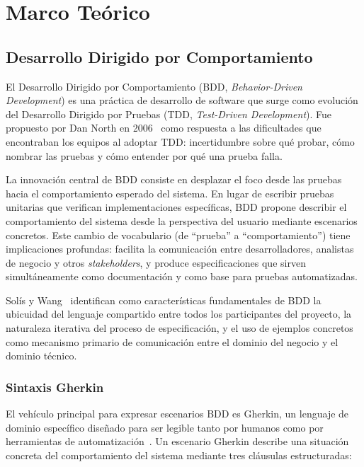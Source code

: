 \chapter{Marco Teórico}

\section{Desarrollo Dirigido por Comportamiento}
\label{sec:bdd}

El Desarrollo Dirigido por Comportamiento (BDD, \textit{Behavior-Driven Development}) es una práctica de desarrollo de software que surge como evolución del Desarrollo Dirigido por Pruebas (TDD, \textit{Test-Driven Development}). Fue propuesto por Dan North en 2006~\cite{north2006bdd} como respuesta a las dificultades que encontraban los equipos al adoptar TDD: incertidumbre sobre qué probar, cómo nombrar las pruebas y cómo entender por qué una prueba falla.

La innovación central de BDD consiste en desplazar el foco desde las pruebas hacia el comportamiento esperado del sistema. En lugar de escribir pruebas unitarias que verifican implementaciones específicas, BDD propone describir el comportamiento del sistema desde la perspectiva del usuario mediante escenarios concretos. Este cambio de vocabulario (de ``prueba'' a ``comportamiento'') tiene implicaciones profundas: facilita la comunicación entre desarrolladores, analistas de negocio y otros \textit{stakeholders}, y produce especificaciones que sirven simultáneamente como documentación y como base para pruebas automatizadas.

Solís y Wang~\cite{solis2011bdd} identifican como características fundamentales de BDD la ubicuidad del lenguaje compartido entre todos los participantes del proyecto, la naturaleza iterativa del proceso de especificación, y el uso de ejemplos concretos como mecanismo primario de comunicación entre el dominio del negocio y el dominio técnico.

\subsection{Sintaxis Gherkin}

El vehículo principal para expresar escenarios BDD es Gherkin, un lenguaje de dominio específico diseñado para ser legible tanto por humanos como por herramientas de automatización~\cite{cucumber2024gherkin}. Un escenario Gherkin describe una situación concreta del comportamiento del sistema mediante tres cláusulas estructuradas:

